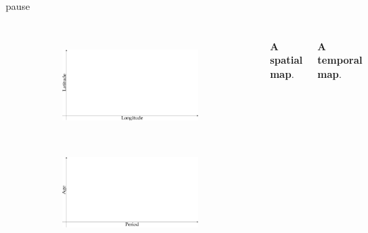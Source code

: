 \documentclass{beamer}
\begin{document}
\begin{frame}{pause}
\frametitle{\insertsection}

\begin{columns}[c]

\begin{figure}[!htb]
\centering
\begin{subfigure}[c]{\textwidth}
\includegraphics[width = \textwidth]{./fig/spatial_map_empty.pdf}
\end{subfigure}\\
\begin{subfigure}[c]{\textwidth}
\includegraphics[width = \textwidth]{./fig/temporal_map_empty.pdf}
\end{subfigure}
\end{figure}

\footnotesize\textbf{A spatial map}.

\vspace{2.5cm}

\footnotesize\textbf{A temporal map}.

\end{columns}

\end{frame}
\end{document}
